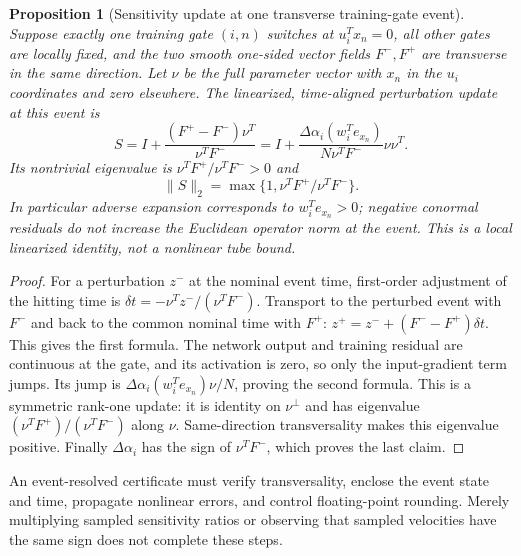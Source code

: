\documentclass[10pt]{article}
\newtheorem{proposition}[theorem]{Proposition}
\begin{document}
\begin{proposition}[Sensitivity update at one transverse training-gate event]
\label{prop:saltation}
Suppose exactly one training gate $(i,n)$ switches at $u_i^Tx_n=0$,
all other gates are locally fixed, and the two smooth one-sided vector fields
$F^-,F^+$ are transverse in the same direction. Let $\nu$ be the full
parameter vector with $x_n$ in the $u_i$ coordinates and zero elsewhere.
The linearized, time-aligned perturbation update at this event is
\[
 S=I+\frac{(F^+-F^-)\nu^T}{\nu^TF^-}
  =I+\frac{\Delta\alpha_i(w_i^Te_{x_n})}
                  {N\nu^TF^-}\nu\nu^T.
\]
Its nontrivial eigenvalue is
$\nu^TF^+/\nu^TF^->0$ and
\[
 \|S\|_2=\max\{1,\nu^TF^+/\nu^TF^-\}.
\]
In particular adverse expansion corresponds to $w_i^Te_{x_n}>0$;
negative conormal residuals do not increase the Euclidean operator norm
at the event. This is a local linearized identity, not a nonlinear tube bound.
\end{proposition}
\begin{proof}
For a perturbation $z^-$ at the nominal event time, first-order adjustment
of the hitting time is $\delta t=-\nu^Tz^-/(\nu^TF^-)$.
Transport to the perturbed event with $F^-$ and back to the common nominal
time with $F^+$: $z^+=z^-+(F^--F^+)\delta t$. This gives the first formula.
The network output and training residual are continuous at the gate, and
its activation is zero, so only the input-gradient term jumps. Its jump
is $\Delta\alpha_i(w_i^Te_{x_n})\nu/N$, proving the second formula.
This is a symmetric rank-one update: it is identity on $\nu^\perp$ and
has eigenvalue $(\nu^TF^+)/ (\nu^TF^-)$ along $\nu$. Same-direction
transversality makes this eigenvalue positive. Finally
$\Delta\alpha_i$ has the sign of $\nu^TF^-$, which proves the last claim.
\end{proof}
An event-resolved certificate must verify transversality, enclose the event
state and time, propagate nonlinear errors, and control floating-point
rounding. Merely multiplying sampled sensitivity ratios or observing that
sampled velocities have the same sign does not complete these steps.
\end{document}
